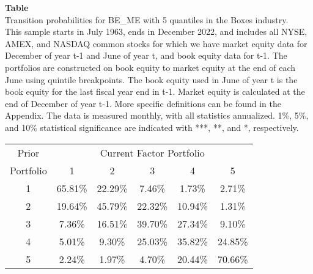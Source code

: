 \begin{table*}[ht!]
\raggedright
{}
\label{tab: transition_probs_BE_ME_Boxes_with_5_quantiles}
\textbf{Table \thetable} \\
Transition probabilities for BE_ME with 5 quantiles in the Boxes industry. \\
\hspace*{1em}This sample starts in July 1963, ends in December 2022, and includes all NYSE, AMEX, and NASDAQ common stocks for which we have market equity data for December of year t-1 and June of year t, and book equity data for t-1. The portfolios are constructed on book equity to market equity at the end of each June using quintile breakpoints.  The book equity used in June of year t is the book equity for the last fiscal year end in t-1.  Market equity is calculated at the end of December of year t-1.  More specific definitions can be found in the Appendix.  The data is measured monthly, with all statistics annualized.  1\%, 5\%, and 10\% statistical significance are indicated with ***, **, and *, respectively. \\
\vspace{0.5em}
\centering
\begin{adjustbox}{max width=\textwidth}
\begin{tabular}{@{}cccccc@{}}
\toprule
Prior & \multicolumn{5}{c}{Current Factor Portfolio} \\
Portfolio & 1 & 2 & 3 & 4 & 5 \\
\midrule
1 & 65.81\% & 22.29\% & 7.46\% & 1.73\% & 2.71\% \\
2 & 19.64\% & 45.79\% & 22.32\% & 10.94\% & 1.31\% \\
3 & 7.36\% & 16.51\% & 39.70\% & 27.34\% & 9.10\% \\
4 & 5.01\% & 9.30\% & 25.03\% & 35.82\% & 24.85\% \\
5 & 2.24\% & 1.97\% & 4.70\% & 20.44\% & 70.66\% \\
\bottomrule
\end{tabular}
\end{adjustbox}
\end{table*}
